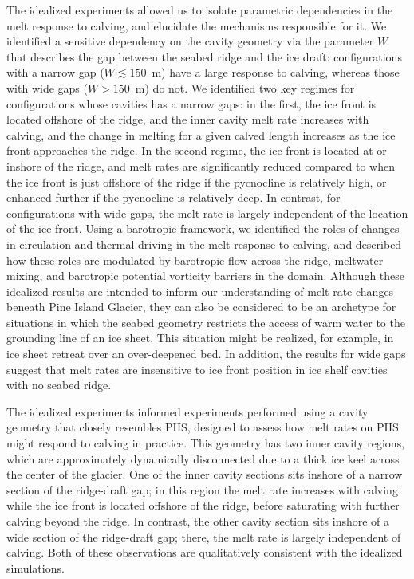\documentclass[draft]{agujournal2019}
\begin{document}
The idealized experiments allowed us to isolate parametric dependencies in the melt response to calving, and elucidate the mechanisms responsible for it. We identified a sensitive dependency on the cavity geometry via the parameter $W$ that describes the gap between the seabed ridge and the ice draft: configurations with a narrow gap ($W \lesssim 150$~m) have a large response to calving, whereas those with wide gaps ($W>150$~m) do not. We identified two key regimes for configurations whose cavities has a narrow gaps: in the first, the ice front is located offshore of the ridge, and the inner cavity melt rate increases with calving, and the change in melting for a given calved length increases as the ice front approaches the ridge. In the second regime, the ice front is located at or inshore of the ridge, and melt rates are significantly reduced compared to when the ice front is just offshore of the ridge if the pycnocline is relatively high, or enhanced further if the pycnocline is relatively deep. In contrast, for configurations with wide gaps, the melt rate is largely independent of the location of the ice front. Using a barotropic framework, we identified the roles of changes in circulation and thermal driving in the melt response to calving, and  described how these roles are modulated by barotropic flow across the ridge, meltwater mixing, and barotropic potential vorticity barriers in the domain. Although these idealized results are intended to inform our understanding of melt rate changes beneath Pine Island Glacier, they can also be considered to be an archetype for situations in which the seabed geometry restricts the access of warm water to the grounding line of an ice sheet. This situation might be realized, for example, in ice sheet retreat over an over-deepened bed. In addition, the results for wide gaps suggest that melt rates are insensitive to ice front position in ice shelf cavities with no seabed ridge.

The idealized experiments informed experiments performed using a cavity geometry that closely resembles PIIS, designed to assess how melt rates on PIIS might respond to calving in practice. This geometry has two inner cavity regions, which are approximately dynamically disconnected due to a thick ice keel across the center of the glacier. One of the inner cavity sections sits inshore of a narrow section of the ridge-draft gap; in this region the melt rate increases with calving while the ice front is located offshore of the ridge, before saturating with further calving beyond the ridge. In contrast, the other cavity section sits inshore of a wide section of the ridge-draft gap; there, the melt rate is largely independent of calving. Both of these observations are qualitatively consistent with the idealized simulations. %
\end{document}
